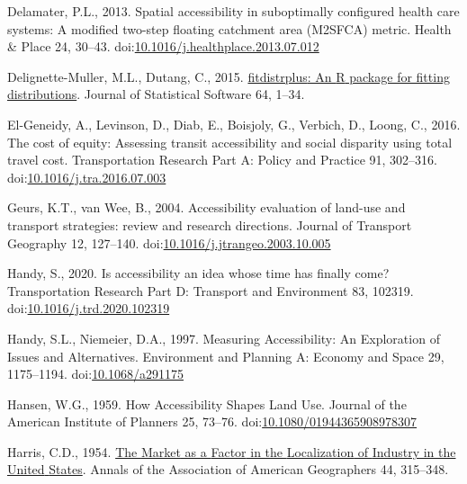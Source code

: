 \documentclass[]{elsarticle} %
\newlength{\cslhangindent}
\newlength{\cslentryspacingunit} %
\newenvironment{CSLReferences}[2] %
 {%
  \setlength{\parindent}{0pt}
  \ifodd #1
  \let\oldpar\par
  \def\par{\hangindent=\cslhangindent\oldpar}
  \fi
  \setlength{\parskip}{#2\cslentryspacingunit}
 }%
 {}
\begin{document}
\begin{CSLReferences}{1}{0}
\leavevmode{}%
Delamater, P.L., 2013. Spatial accessibility in suboptimally configured
health care systems: A modified two-step floating catchment area
(M2SFCA) metric. Health \& Place 24, 30--43.
doi:\href{https://doi.org/10.1016/j.healthplace.2013.07.012}{10.1016/j.healthplace.2013.07.012}

\leavevmode{}%
Delignette-Muller, M.L., Dutang, C., 2015.
\href{https://www.jstatsoft.org/article/view/v064i04}{{fitdistrplus}: An
{R} package for fitting distributions}. Journal of Statistical Software
64, 1--34.

\leavevmode{}%
El-Geneidy, A., Levinson, D., Diab, E., Boisjoly, G., Verbich, D.,
Loong, C., 2016. The cost of equity: {Assessing} transit accessibility
and social disparity using total travel cost. Transportation Research
Part A: Policy and Practice 91, 302--316.
doi:\href{https://doi.org/10.1016/j.tra.2016.07.003}{10.1016/j.tra.2016.07.003}

\leavevmode{}%
Geurs, K.T., van Wee, B., 2004. Accessibility evaluation of land-use and
transport strategies: review and research directions. Journal of
Transport Geography 12, 127--140.
doi:\href{https://doi.org/10.1016/j.jtrangeo.2003.10.005}{10.1016/j.jtrangeo.2003.10.005}

\leavevmode{}%
Handy, S., 2020. Is accessibility an idea whose time has finally come?
Transportation Research Part D: Transport and Environment 83, 102319.
doi:\href{https://doi.org/10.1016/j.trd.2020.102319}{10.1016/j.trd.2020.102319}

\leavevmode{}%
Handy, S.L., Niemeier, D.A., 1997. Measuring {Accessibility}: {An}
{Exploration} of {Issues} and {Alternatives}. Environment and Planning
A: Economy and Space 29, 1175--1194.
doi:\href{https://doi.org/10.1068/a291175}{10.1068/a291175}

\leavevmode{}%
Hansen, W.G., 1959. How Accessibility Shapes Land Use. Journal of the
American Institute of Planners 25, 73--76.
doi:\href{https://doi.org/10.1080/01944365908978307}{10.1080/01944365908978307}

\leavevmode{}%
Harris, C.D., 1954. \href{https://www.jstor.org/stable/2561395}{The
{Market} as a {Factor} in the {Localization} of {Industry} in the
{United} {States}}. Annals of the Association of American Geographers
44, 315--348.


\end{CSLReferences}
\end{document}
